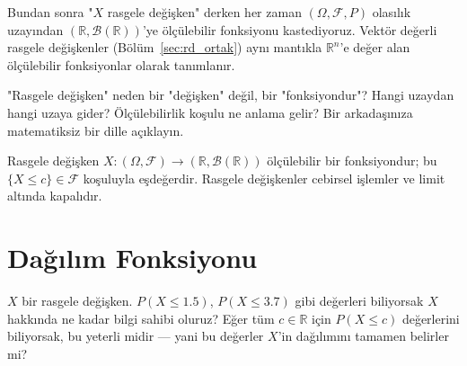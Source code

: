 \begin{hocanotu}
Bundan sonra "$X$ rasgele değişken" derken her zaman
$(\Omega, \mathcal{F}, P)$ olasılık uzayından $(\mathbb{R}, \mathcal{B}(\mathbb{R}))$'ye
ölçülebilir fonksiyonu kastediyoruz. Vektör değerli rasgele değişkenler
(Bölüm~\ref{sec:rd_ortak}) aynı mantıkla $\mathbb{R}^n$'e değer alan ölçülebilir
fonksiyonlar olarak tanımlanır.
\end{hocanotu}

\begin{kendinleifade}
"Rasgele değişken" neden bir "değişken" değil, bir "fonksiyondur"?
Hangi uzaydan hangi uzaya gider? Ölçülebilirlik koşulu ne anlama gelir?
Bir arkadaşınıza matematiksiz bir dille açıklayın.
\end{kendinleifade}

\begin{mikroozet}
Rasgele değişken $X : (\Omega, \mathcal{F}) \to (\mathbb{R}, \mathcal{B}(\mathbb{R}))$
ölçülebilir bir fonksiyondur; bu $\{X \leq c\} \in \mathcal{F}$ koşuluyla
eşdeğerdir. Rasgele değişkenler cebirsel işlemler ve limit altında kapalıdır.
\end{mikroozet}

\section{Dağılım Fonksiyonu}
\label{sec:dagilim_fonksiyonu}

\begin{kesif}
$X$ bir rasgele değişken. $P(X \leq 1.5)$, $P(X \leq 3.7)$ gibi değerleri
biliyorsak $X$ hakkında ne kadar bilgi sahibi oluruz?
Eğer tüm $c \in \mathbb{R}$ için $P(X \leq c)$ değerlerini biliyorsak,
bu yeterli midir --- yani bu değerler $X$'in dağılımını tamamen belirler mi?
\end{kesif}

